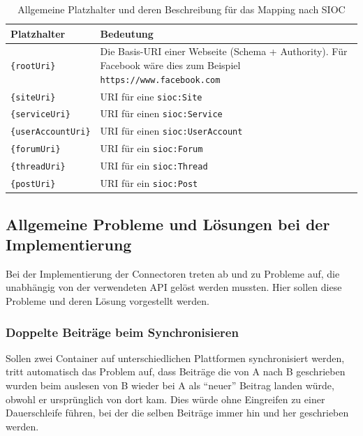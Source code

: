 \begin{table}[ht]
    \centering
    \caption{Allgemeine Platzhalter und deren Beschreibung für das Mapping nach SIOC}
    \begin{tabular}{l|p{11cm}}
        \textbf{Platzhalter} & \textbf{Bedeutung} \\ 
        \hline
        \texttt{\{rootUri\}} & Die Basis-URI einer Webseite (Schema + Authority\footnotemark). Für Facebook wäre dies zum Beispiel \texttt{https://www.facebook.com} \\
        \texttt{\{siteUri\}} & URI für eine \texttt{sioc:Site} \\
        \texttt{\{serviceUri\}} & URI für einen \texttt{sioc:Service} \\
        \texttt{\{userAccountUri\}} & URI für einen \texttt{sioc:UserAccount} \\
        \texttt{\{forumUri\}} & URI für ein \texttt{sioc:Forum} \\
        \texttt{\{threadUri\}} & URI für ein \texttt{sioc:Thread} \\
        \texttt{\{postUri\}} & URI für ein \texttt{sioc:Post}
    \end{tabular}
    \label{tbl:platzhalter_fuer_sioc_mapping}
\end{table}


\subsection{Allgemeine Probleme und Lösungen bei der Implementierung} %
\label{sub:allgemeine_probleme}

Bei der Implementierung der Connectoren treten ab und zu Probleme auf, die unabhängig von der verwendeten API gelöst werden mussten. Hier sollen diese Probleme und deren Lösung vorgestellt werden. 

\subsubsection{Doppelte Beiträge beim Synchronisieren} %
\label{ssub:doppelte_beitraege_beim_synchronisieren}

Sollen zwei Container auf unterschiedlichen Plattformen synchronisiert werden, tritt automatisch das Problem auf, dass Beiträge die von A nach B geschrieben wurden beim auslesen von B wieder bei A als \enquote{neuer} Beitrag landen würde, obwohl er ursprünglich von dort kam. Dies würde ohne Eingreifen zu einer Dauerschleife führen, bei der die selben Beiträge immer hin und her geschrieben werden. 

